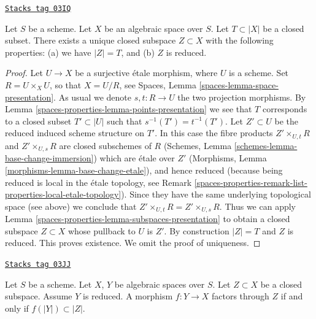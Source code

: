 \begin{lemma}
\label{spaces-properties-lemma-reduced-closed-subspace}
\href{https://stacks.math.columbia.edu/tag/03IQ}{\texttt{Stacks tag 03IQ}}

Let $S$ be a scheme.
Let $X$ be an algebraic space over $S$.
Let $T \subset |X|$ be a closed subset.
There exists a unique closed subspace $Z \subset X$ with
the following properties: (a) we have $|Z| = T$, and (b) $Z$ is reduced.
\end{lemma}

\begin{proof}
Let $U \to X$ be a surjective \'etale morphism, where $U$ is a scheme.
Set $R = U \times_X U$, so that $X = U/R$, see
Spaces, Lemma \ref{spaces-lemma-space-presentation}.
As usual we denote $s, t : R \to U$ the two projection morphisms.
By Lemma \ref{spaces-properties-lemma-points-presentation}
we see that $T$ corresponds to a closed subset $T' \subset |U|$ such
that $s^{-1}(T') = t^{-1}(T')$.
Let $Z' \subset U$ be the reduced induced scheme structure on $T'$.
In this case the fibre products
$Z' \times_{U, t} R$ and $Z' \times_{U, s} R$ are closed subschemes
of $R$
(Schemes, Lemma \ref{schemes-lemma-base-change-immersion})
which are \'etale over $Z'$
(Morphisms, Lemma \ref{morphisms-lemma-base-change-etale}),
and hence reduced
(because being reduced is local in the \'etale topology, see
Remark \ref{spaces-properties-remark-list-properties-local-etale-topology}).
Since they have the same underlying topological space (see above)
we conclude that $Z' \times_{U, t} R = Z' \times_{U, s} R$.
Thus we can apply Lemma \ref{spaces-properties-lemma-subspaces-presentation}
to obtain a closed subspace $Z \subset X$ whose pullback to $U$ is $Z'$.
By construction $|Z| = T$ and $Z$ is reduced. This proves existence.
We omit the proof of uniqueness.
\end{proof}

\begin{lemma}
\label{spaces-properties-lemma-map-into-reduction}
\href{https://stacks.math.columbia.edu/tag/03JJ}{\texttt{Stacks tag 03JJ}}

Let $S$ be a scheme.
Let $X$, $Y$ be algebraic spaces over $S$.
Let $Z \subset X$ be a closed subspace.
Assume $Y$ is reduced.
A morphism $f : Y \to X$ factors through $Z$ if and only if
$f(|Y|) \subset |Z|$.
\end{lemma}


